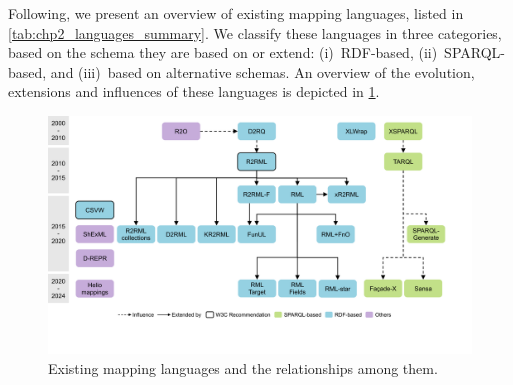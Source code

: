 Following, we present an overview of existing mapping languages, listed in \cref{tab:chp2_languages_summary}. We classify these languages in three categories, based on the schema they are based on or extend: (i)~RDF-based, (ii)~SPARQL-based, and (iii)~based on alternative schemas. An overview of the evolution, extensions and influences of these languages is depicted in \cref{fig:chp2_mapping_languages}.



\begin{figure}[h]
\centering
\includegraphics[width=1\linewidth]{figures/chp2_mapping_languages}
\caption[Existing mapping languages and the relationships among them]{Existing mapping languages and the relationships among them.}
\label{fig:chp2_mapping_languages}
\end{figure}

